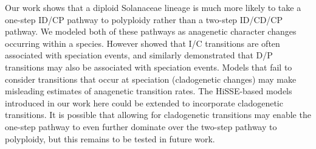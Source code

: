 
%
%

Our work shows that a diploid Solanaceae lineage is much more likely to take a
one-step ID/CP pathway to polyploidy rather than a two-step ID/CD/CP pathway. 
We modeled both of these pathways as anagenetic character changes occurring within a species.
However \citet{goldberg_2012} showed that I/C transitions are often associated with speciation events, and similarly \citet{freyman_2017} demonstrated that D/P transitions may also be associated with speciation events. 
Models that fail to consider transitions that occur at speciation (cladogenetic changes) may
make misleading estimates of anagenetic transition rates.
The HiSSE-based models introduced in our work here could be extended to incorporate cladogenetic transitions. 
It is possible that allowing for cladogenetic transitions may enable the one-step pathway
to even further dominate over the two-step pathway to polyploidy, but this remains to be tested in future work.

